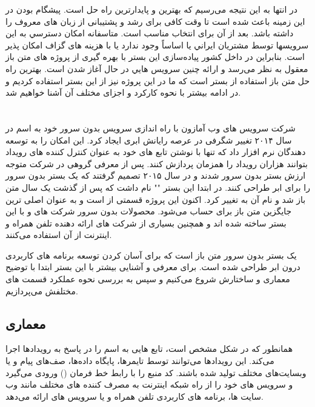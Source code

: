 در انتها به این نتیجه می‌رسیم که بهترین و پایدارترین راه حل  است. پیشگام بودن در این زمینه باعث شده است تا وقت کافی برای رشد و پشتیبانی از زبان های معروف را داشته باشد. بعد از آن  برای انتخاب مناسب است. متاسفانه امكان دسترسي به اين سرويسها توسط مشتريان ايراني يا اساساً وجود ندارد يا با هزينه های گزاف امكان پذير است. بنابراین در داخل کشور پیاده‌سازی این بستر با بهره گیری از پروژه های متن باز معقول به نظر می‌رسد و ارائه چنين سرويس هايي در حال آغاز شدن است. بهترین راه حل متن باز استفاده از بستر  است که ما در این پروژه نیز از این بستر استفاده کردیم و در ادامه بیشتر با نحوه کارکرد و اجزای مختلف آن آشنا خواهیم شد.

\section{}

شرکت سرویس های وب آمازون با راه اندازی سرویس بدون سرور خود به اسم  در سال ۲۰۱۴ تغییر شگرفی در عرصه رایانش ابری ایجاد کرد.  این امکان را به توسعه دهندگان نرم افزار داد که تنها با نوشتن تابع های خود به عنوان کنترل کننده های رویداد بتوانند هزاران رویداد را همزمان پردازش کنند. پس از معرفی  گروهی در شرکت  متوجه ارزش بستر بدون سرور شدند و در سال ۲۰۱۵ تصمیم گرفتند که یک بستر بدون سرور را برای ابر  طراحی کنند. در ابتدا این بستر "" نام داشت که پس از گذشت یک سال متن باز شد و نام آن به  تغییر کرد. اکنون این پروژه قسمتی از  است و به عنوان اصلی ترین جایگزین متن باز برای  حساب می‌شود. محصولات بدون سرور شرکت های  و  با این بستر ساخته شده اند و همچنین بسیاری از شرکت های ارائه دهنده تلفن همراه و اینترنت از آن استفاده می‌کنند.

 یک بستر بدون سرور متن باز است که برای آسان کردن توسعه برنامه های کاربردی درون ابر طراحی شده است. برای معرفی و آشنایی بیشتر با این بستر ابتدا با توضیح معماری و ساختارش شروع می‌کنیم و سپس به بررسی نحوه عملکرد قسمت های مختلفش می‌پردازیم.

\subsection{معماری }

همانطور که در شکل مشخص است،  تابع هایی به اسم  را در پاسخ به رویدادها اجرا می‌کند. این رویدادها می‌توانند توسط تایمرها، پایگاه داده‌ها، صف‌های پیام و یا وبسایت‌های مختلف تولید شده باشند.  کد منبع را با رابط خط فرمان () ورودی می‌گیرد و سرویس های خود را از راه  شبکه اینترنت به مصرف کننده های مختلف مانند وب سایت ها، برنامه های کاربردی تلفن همراه و یا سرویس های  ارائه می‌دهد. 

